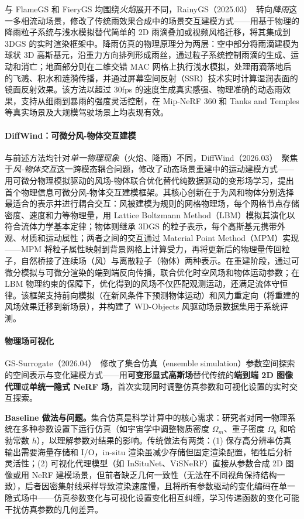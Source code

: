 与 FlameGS 和 FieryGS 均围绕\emph{火焰}展开不同，RainyGS（2025.03）~\cite{2503_21442}转向\emph{降雨}这一多相流动场景，修改了传统雨效果合成中的场景交互建模方式——用基于物理的降雨粒子系统与浅水模拟替代简单的 2D 雨滴叠加或视频风格迁移，将其集成到 3DGS 的实时渲染框架中。降雨仿真的物理原理分为两层：空中部分将雨滴建模为球状 3D 高斯基元，沿重力方向排列形成雨丝，通过粒子系统控制雨滴的生成、运动和消亡；地面部分则在二维交错 MAC 网格上执行浅水模拟，处理雨滴落地后的飞溅、积水和涟漪传播，并通过屏幕空间反射（SSR）技术实时计算湿润表面的镜面反射效果。该方法以超过 30fps 的速度生成真实感强、物理准确的动态雨效果，支持从细雨到暴雨的强度灵活控制，在 Mip-NeRF 360 和 Tanks and Temples 等真实场景及大规模驾驶场景上均表现有效。

\paragraph{DiffWind：可微分风-物体交互建模}

与前述方法均针对\emph{单一物理现象}（火焰、降雨）不同，DiffWind（2026.03）~\cite{2603_09668}聚焦于\emph{风-物体交互}这一跨模态耦合问题，修改了动态场景重建中的运动建模方式——用可微分物理模拟驱动的风场-物体联合优化替代纯数据驱动的变形场学习，提出首个物理信息可微分风-物体交互建模框架。其核心创新在于为风和物体分别选择最适合的表示并进行耦合交互：风被建模为规则的网格物理场，每个网格节点存储密度、速度和力等物理量，用 Lattice Boltzmann Method（LBM）模拟其演化以符合流体力学基本定律；物体则继承 3DGS 的粒子表示，每个高斯基元携带外观、材质和运动属性；两者之间的交互通过 Material Point Method（MPM）实现——MPM 将粒子属性映射到背景网格上计算受力，再将更新后的物理量传回粒子，自然桥接了连续场（风）与离散粒子（物体）两种表示。在重建阶段，通过可微分模拟与可微分渲染的端到端反向传播，联合优化时空风场和物体运动参数；在 LBM 物理约束的保障下，优化得到的风场不仅匹配观测运动，还满足流体守恒律。该框架支持前向模拟（在新风条件下预测物体运动）和风力重定向（将重建的风场效果迁移到新场景），并构建了 WD-Objects 风驱动场景数据集用于系统评测。

\paragraph{物理场可视化}

GS-Surrogate（2026.04）~\cite{2604_06358}修改了集合仿真（ensemble simulation）参数空间探索的空间表示与变化建模方式——用\textbf{可变形显式高斯场}替代传统的\textbf{端到端 2D 图像代理}或\textbf{单统一隐式 NeRF 场}，首次实现同时调整仿真参数和可视化设置的实时交互探索。

\textbf{Baseline 做法与问题。}集合仿真是科学计算中的核心需求：研究者对同一物理系统在多种参数设置下运行仿真（如宇宙学中调整物质密度 $\Omega_m$、重子密度 $\Omega_b$ 和哈勃常数 $h$），以理解参数对结果的影响。传统做法有两类：(1) 保存高分辨率仿真输出需要海量存储和 I/O，in-situ 渲染虽减少存储但固定渲染配置，牺牲后分析灵活性；(2) 可视化代理模型（如 InSituNet、ViSNeRF）直接从参数合成 2D 图像或用 NeRF 建模场景，但前者缺乏几何一致性（无法在不同视角保持结构一致），后者因密集射线采样导致渲染速度慢，且将所有参数驱动的变化编码在单一隐式场中——仿真参数变化与可视化设置变化相互纠缠，学习传递函数的变化可能干扰仿真参数的几何差异。

